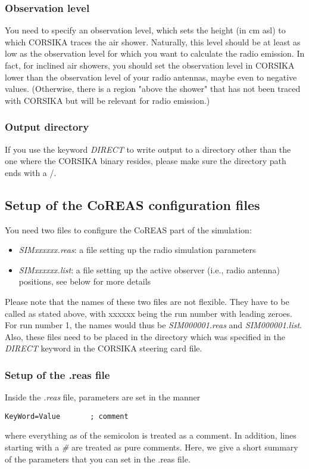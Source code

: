 \documentclass[a4paper,10pt]{article}
\begin{document}
\subsubsection{Observation level}
You need to specify an observation level, which sets the height (in cm asl) to which CORSIKA traces the air shower. Naturally, this level should be at least as low as the observation level for which you want to calculate the radio emission. In fact, for inclined air showers, you should set the observation level in CORSIKA lower than the observation level of your radio antennas, maybe even to negative values. (Otherwise, there is a region "above the shower" that has not been traced with CORSIKA but will be relevant for radio emission.)

\subsubsection{Output directory}
If you use the keyword {\it DIRECT} to write output to a directory other than the one where the CORSIKA binary resides, please make sure the directory path ends with a /.

\subsection{Setup of the CoREAS configuration files}

You need two files to configure the CoREAS part of the simulation:
%
\begin{itemize}
\item{{\it SIMxxxxxx.reas}: a file setting up the radio simulation parameters}
\item{{\it SIMxxxxxx.list}: a file setting up the active observer (i.e., radio antenna) positions, see below for more details}
\end{itemize}
%
Please note that the names of these two files are not flexible. They have to be called as stated above, with xxxxxx being the run number with leading zeroes. For run number 1, the names would thus be {\it SIM000001.reas} and {\it SIM000001.list}. Also, these files need to be placed in the directory which was specified in the {\it DIRECT} keyword in the CORSIKA steering card file.

\subsubsection{Setup of the .reas file}

Inside the {\it .reas} file, parameters are set in the manner
%
\begin{verbatim}
KeyWord=Value		; comment
\end{verbatim}
%
where everything as of the semicolon is treated as a comment. In addition, lines starting with a {\it \#} are treated as pure comments. Here, we give a short summary of the parameters that you can set in the .reas file.\\
\end{document}
